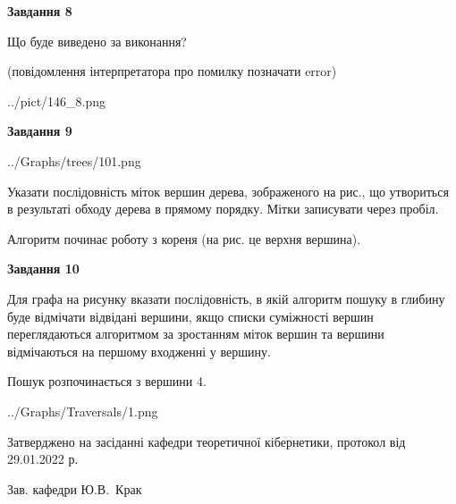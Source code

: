 \documentclass[12pt, ukrainian]{article}
\begin{document}
{\begin {large}
{\begin {center}\textbf{Завдання 8}\end {center}}\par
Що буде виведено за виконання?\par
 (повідомлення інтерпретатора про помилку позначати error)\par
\begin{center}
	{../pict/146_8.png}
\end{center}
\newpage

{\begin {center}\textbf{Завдання 9}\end {center}}\par

\begin{center}
	{../Graphs/trees/101.png}
\end{center}
Указати послідовність міток вершин дерева, зображеного на рис., що утвориться в результаті обходу дерева в прямому порядку. Мітки записувати через пробіл.\par Алгоритм починає роботу з кореня (на рис. це верхня вершина).\par
\newpage

{\begin {center}\textbf{Завдання 10}\end {center}}\par
Для графа на рисунку вказати послідовність, в якій алгоритм пошуку в глибину буде відмічати відвідані вершини, якщо списки суміжності вершин переглядаються алгоритмом за зростанням міток вершин та вершини відмічаються на першому вход\-женні у вершину.\par
Пошук розпочинається з вершини 4.\par

\begin{center}
	{../Graphs/Traversals/1.png}
\end{center}\par
\newpage


\end {large}
}
{\smallskip \begin {small} Затверджено на засіданні кафедри теоретичної кібернетики, протокол  від   29.01.2022 р.\par\smallskip\smallskip
{\parbox {6.5 cm}{Зав. кафедри \dotfill Ю.В.~Крак}} \end{small}}
\end{document}
